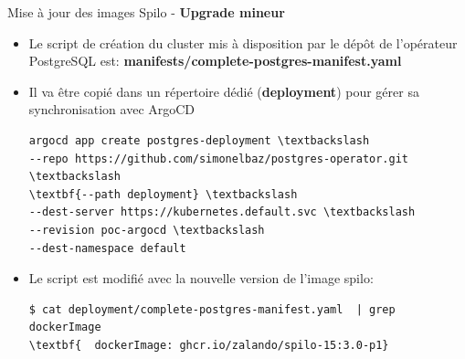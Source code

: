 
\begin{frame}[fragile]{Mise à jour des images Spilo - \textbf{Upgrade mineur}}

   \begin{itemize}
      \item Le script de création du cluster mis à disposition par le dépôt de l'opérateur PostgreSQL est: \textbf{manifests/complete-postgres-manifest.yaml}
      \item Il va être copié dans un répertoire dédié (\textbf{deployment}) pour gérer sa synchronisation avec ArgoCD
\begin{tiny}
\begin{Verbatim}[commandchars=\\\{\}]
argocd app create postgres-deployment \textbackslash
--repo https://github.com/simonelbaz/postgres-operator.git \textbackslash
\textbf{--path deployment} \textbackslash
--dest-server https://kubernetes.default.svc \textbackslash
--revision poc-argocd \textbackslash
--dest-namespace default
\end{Verbatim}
\end{tiny}
      \item Le script est modifié avec la nouvelle version de l'image spilo:
\begin{tiny}
\begin{Verbatim}[commandchars=\\\{\}]
$ cat deployment/complete-postgres-manifest.yaml  | grep dockerImage
\textbf{  dockerImage: ghcr.io/zalando/spilo-15:3.0-p1}
\end{Verbatim}
\end{tiny}
   \end{itemize}

\end{frame}


